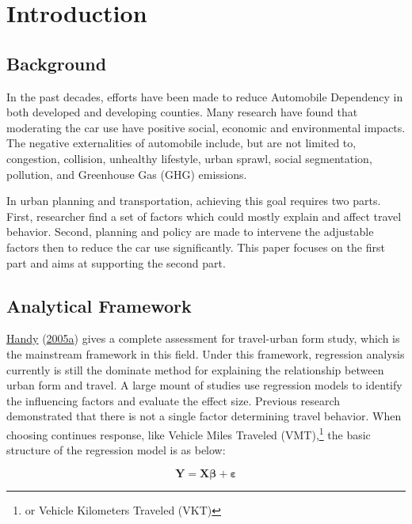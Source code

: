 \documentclass[
  11pt,
  openany]{memoir}
\begin{document}
\hypertarget{intro}{%
\chapter{Introduction}\label{intro}}

\hypertarget{background}{%
\section{Background}\label{background}}

In the past decades, efforts have been made to reduce Automobile Dependency in both developed and developing counties. Many research have found that moderating the car use have positive social, economic and environmental impacts. The negative externalities of automobile include, but are not limited to, congestion, collision, unhealthy lifestyle, urban sprawl, social segmentation, pollution, and Greenhouse Gas (GHG) emissions.

In urban planning and transportation, achieving this goal requires two parts. First, researcher find a set of factors which could mostly explain and affect travel behavior. Second, planning and policy are made to intervene the adjustable factors then to reduce the car use significantly.
This paper focuses on the first part and aims at supporting the second part.

\hypertarget{analytical-framework}{%
\section{Analytical Framework}\label{analytical-framework}}

\protect\hyperlink{ref-handyCriticalAssessmentLiterature2005}{Handy} (\protect\hyperlink{ref-handyCriticalAssessmentLiterature2005}{2005a}) gives a complete assessment for travel-urban form study, which is the mainstream framework in this field.
Under this framework, regression analysis currently is still the dominate method for explaining the relationship between urban form and travel.
A large mount of studies use regression models to identify the influencing factors and evaluate the effect size. Previous research demonstrated that there is not a single factor determining travel behavior. When choosing continues response, like Vehicle Miles Traveled (VMT),\footnote{or Vehicle Kilometers Traveled (VKT)} the basic structure of the regression model is as below:

\begin{equation}
\mathbf{Y}=\mathbf{X}\boldsymbol{\beta}+\boldsymbol{\varepsilon}
\label{eq:lm}
\end{equation}
\end{document}
